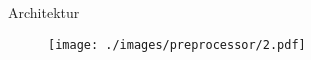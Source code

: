 \begin{frame}{Architektur}
    \begin{figure}
    	\centering
    	\texttt{[image: ./images/preprocessor/2.pdf]}
    \end{figure}
\end{frame}
